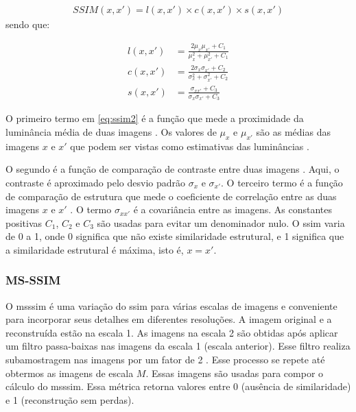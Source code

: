 \begin{equation}
\begin{aligned}
SSIM(x,x') = l(x,x') \times c(x,x') \times s(x,x') 
\end{aligned}
\end{equation}
\noindent sendo que:

\begin{equation}
\label{eq:ssim2}
\begin{aligned}
l(x,x') &= \frac{2\mu_x\mu_{x'} + C_1}{\mu_{x}^2+\mu_{x'}^2 + C_1} \\
c(x,x') &= \frac{2\sigma_x\sigma_{x'} + C_2}{\sigma_{x}^2+\sigma_{x'}^2 + C_2} \\
s(x,x') &= \frac{\sigma_{xx'}+ C_3}{\sigma_{x}\sigma_{x'} + C_3}	
\end{aligned} 
\end{equation}


O primeiro termo em \ref{eq:ssim2} é a função que mede a proximidade da luminância média de duas imagens \cite{hore2010image}. Os valores de $\mu_x$ e $\mu_{x'}$ são as médias das imagens $x$ e $x'$ que podem ser vistas como estimativas das luminâncias \cite{wang2003multiscale}. 

O segundo é a função de comparação de contraste entre duas imagens \cite{hore2010image}. Aqui, o contraste é aproximado pelo desvio padrão $\sigma_x$ e $\sigma_{x'}$.
O terceiro termo é a função de comparação de estrutura que mede o coeficiente de correlação entre as duas imagens $x$ e $x'$ \cite{hore2010image}. O termo $\sigma_{xx'}$ é a covariância entre as imagens.  As constantes positivas $C_1$, $C_2$ e $C_3$ são usadas para evitar um denominador nulo.
O \acrshort{ssim} varia de 0 a 1, onde 0 significa que não existe similaridade estrutural, e 1 significa que a similaridade estrutural é máxima, isto é, $x = x'$.


\subsubsection{MS-SSIM}
O \acrshort{msssim} \cite{wang2003multiscale} é uma variação do \acrshort{ssim} para várias escalas de imagens e conveniente para incorporar seus detalhes em diferentes resoluções. A imagem original e a reconstruída estão na escala 1. As imagens na escala 2 são obtidas após aplicar um filtro passa-baixas nas imagens da escala 1 (escala anterior). Esse filtro realiza subamostragem nas imagens por um fator de 2 \cite{wang2003multiscale}. Esse processo se repete até obtermos as imagens de escala $M$. 
Essas imagens são usadas para compor o cálculo do \acrshort{msssim}. Essa métrica retorna valores entre 0 (ausência de similaridade) e 1 (reconstrução sem perdas). 



